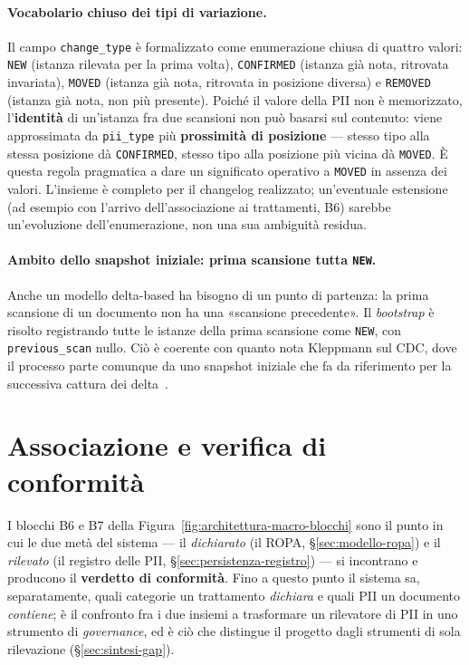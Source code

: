 \paragraph{Vocabolario chiuso dei tipi di variazione.} Il campo \texttt{change\_type} è formalizzato come enumerazione chiusa di quattro valori: \texttt{NEW} (istanza rilevata per la prima volta), \texttt{CONFIRMED} (istanza già nota, ritrovata invariata), \texttt{MOVED} (istanza già nota, ritrovata in posizione diversa) e \texttt{REMOVED} (istanza già nota, non più presente). Poiché il valore della PII non è memorizzato, l'\textbf{identità} di un'istanza fra due scansioni non può basarsi sul contenuto: viene approssimata da \texttt{pii\_type} più \textbf{prossimità di posizione} --- stesso tipo alla stessa posizione dà \texttt{CONFIRMED}, stesso tipo alla posizione più vicina dà \texttt{MOVED}. È questa regola pragmatica a dare un significato operativo a \texttt{MOVED} in assenza dei valori. L'insieme è completo per il changelog realizzato; un'eventuale estensione (ad esempio con l'arrivo dell'associazione ai trattamenti, B6) sarebbe un'evoluzione dell'enumerazione, non una sua ambiguità residua.

\paragraph{Ambito dello snapshot iniziale: prima scansione tutta \texttt{NEW}.} Anche un modello delta-based ha bisogno di un punto di partenza: la prima scansione di un documento non ha una «scansione precedente». Il \textit{bootstrap} è risolto registrando tutte le istanze della prima scansione come \texttt{NEW}, con \texttt{previous\_scan} nullo. Ciò è coerente con quanto nota Kleppmann sul CDC, dove il processo parte comunque da uno snapshot iniziale che fa da riferimento per la successiva cattura dei delta~\cite{kleppmannDesigningDataIntensive2017}.

\section{Associazione e verifica di conformità}
\label{sec:conformita}

I blocchi B6 e B7 della Figura~\ref{fig:architettura-macro-blocchi} sono il punto in cui le due metà del sistema --- il \emph{dichiarato} (il ROPA, §\ref{sec:modello-ropa}) e il \emph{rilevato} (il registro delle PII, §\ref{sec:persistenza-registro}) --- si incontrano e producono il \textbf{verdetto di conformità}. Fino a questo punto il sistema sa, separatamente, quali categorie un trattamento \emph{dichiara} e quali PII un documento \emph{contiene}; è il confronto fra i due insiemi a trasformare un rilevatore di PII in uno strumento di \emph{governance}, ed è ciò che distingue il progetto dagli strumenti di sola rilevazione (§\ref{sec:sintesi-gap}).

